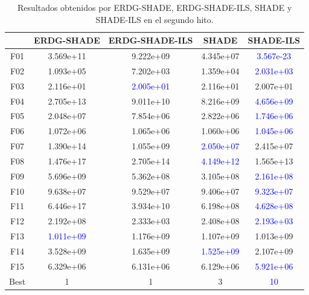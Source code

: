 \begin{table}[h]
\centering
\begin{tabular}{ccccc}
\toprule
{} &  \textbf{ERDG-SHADE} & \textbf{ERDG-SHADE-ILS} & \textbf{SHADE} & \textbf{SHADE-ILS} \\
\midrule
F01  &  3.569e+11 &    9.222e+09 &  4.345e+07 &  \textcolor{blue}{3.567e-23} \\
F02  &  1.093e+05 &    7.202e+03 &  1.359e+04 &  \textcolor{blue}{2.031e+03} \\
F03  &  2.116e+01 &    \textcolor{blue}{2.005e+01} &  2.116e+01 &  2.007e+01 \\
F04  &  2.705e+13 &    9.011e+10 &  8.216e+09 &  \textcolor{blue}{4.656e+09} \\
F05  &  2.048e+07 &    7.854e+06 &  2.822e+06 &  \textcolor{blue}{1.746e+06} \\
F06  &  1.072e+06 &    1.065e+06 &  1.060e+06 &  \textcolor{blue}{1.045e+06} \\
F07  &  1.390e+14 &    1.055e+09 &  \textcolor{blue}{2.050e+07} &  2.415e+07 \\
F08  &  1.476e+17 &    2.705e+14 &  \textcolor{blue}{4.149e+12} &  1.565e+13 \\
F09  &  5.696e+09 &    5.362e+08 &  3.105e+08 &  \textcolor{blue}{2.161e+08} \\
F10  &  9.638e+07 &    9.529e+07 &  9.406e+07 &  \textcolor{blue}{9.323e+07} \\
F11  &  6.446e+17 &    3.934e+10 &  6.198e+08 &  \textcolor{blue}{4.628e+08} \\
F12  &  2.192e+08 &    2.333e+03 &  2.408e+08 &  \textcolor{blue}{2.193e+03} \\
F13  &  \textcolor{blue}{1.011e+09} &    1.176e+09 &  1.107e+09 &  1.013e+09 \\
F14  &  3.528e+09 &    1.635e+09 &  \textcolor{blue}{1.525e+09} &  2.107e+09 \\
F15  &  6.329e+06 &    6.131e+06 &  6.129e+06 &  \textcolor{blue}{5.921e+06} \\
Best &          1 &            1 &          3 &         \textcolor{blue}{10} \\
\bottomrule
\end{tabular}
\caption{Resultados obtenidos por ERDG-SHADE, ERDG-SHADE-ILS, SHADE y SHADE-ILS en el segundo hito.}
\label{tab:resultados_erdg_shade_2}
\end{table}

